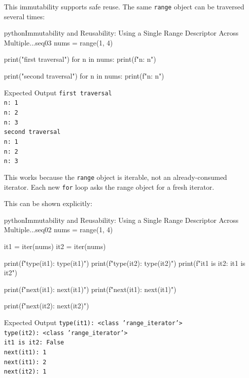 This immutability supports safe reuse. The same \texttt{range} object can be traversed several times:

\begin{codebox}[]{python}{Immutability and Reusability: Using a Single Range Descriptor Across Multiple...}{seq03}
nums = range(1, 4)

print("first traversal")
for n in nums:
    print(f"n: {n}")

print("second traversal")
for n in nums:
    print(f"n: {n}")
\end{codebox}


\begin{iobox}{Expected Output}
\texttt{first traversal} \\
\texttt{n: 1} \\
\texttt{n: 2} \\
\texttt{n: 3} \\
\texttt{second traversal} \\
\texttt{n: 1} \\
\texttt{n: 2} \\
\texttt{n: 3} \\
\end{iobox}


This works because the \texttt{range} object is iterable, not an already-consumed iterator. Each new \texttt{for} loop asks the range object for a fresh iterator.

This can be shown explicitly:

\begin{codebox}[]{python}{Immutability and Reusability: Using a Single Range Descriptor Across Multiple...}{seq02}
nums = range(1, 4)

it1 = iter(nums)
it2 = iter(nums)

print(f"type(it1): {type(it1)}")
print(f"type(it2): {type(it2)}")
print(f"it1 is it2: {it1 is it2}")

print(f"next(it1): {next(it1)}")
print(f"next(it1): {next(it1)}")

print(f"next(it2): {next(it2)}")
\end{codebox}


\begin{iobox}{Expected Output}
\texttt{type(it1): <class 'range\_iterator'>} \\
\texttt{type(it2): <class 'range\_iterator'>} \\
\texttt{it1 is it2: False} \\
\texttt{next(it1): 1} \\
\texttt{next(it1): 2} \\
\texttt{next(it2): 1} \\
\end{iobox}


